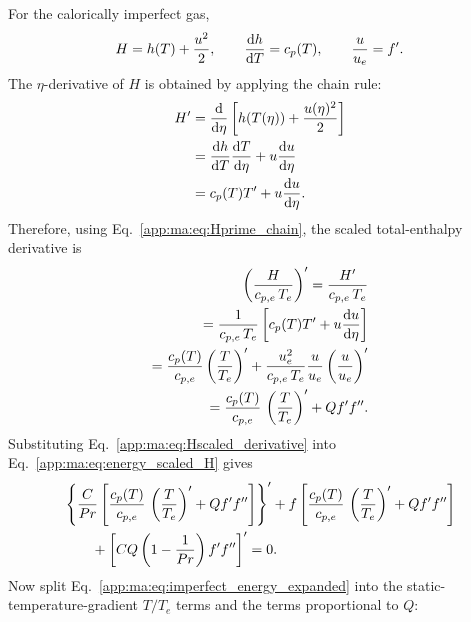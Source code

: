 For the calorically imperfect gas,
\begin{equation}
  H=h(T)+\frac{u^2}{2},
  \qquad
  \frac{\mathrm{d} h}{\mathrm{d} T}=c_p(T),
  \qquad
  \frac{u}{u_e}=f'.
  \label{app:ma:eq:imperfect_enthalpy_def}
\end{equation}
The \(\eta\)-derivative of \(H\) is obtained by applying the chain rule:
\begin{align}
  H'
  &=
  \frac{\mathrm{d}}{\mathrm{d}\eta}
  \left[
    h(T(\eta))+\frac{u(\eta)^2}{2}
  \right]
  \nonumber\\
  &=
  \frac{\mathrm{d} h}{\mathrm{d} T}\frac{\mathrm{d} T}{\mathrm{d}\eta}
  +
  u\frac{\mathrm{d} u}{\mathrm{d}\eta}
  \nonumber\\
  &=
  c_p(T)T'
  +
  u\frac{\mathrm{d} u}{\mathrm{d}\eta}.
  \label{app:ma:eq:Hprime_chain}
\end{align}
Therefore, using Eq.~\eqref{app:ma:eq:Hprime_chain}, the scaled total-enthalpy derivative is
\begin{align}
  \left(\frac{H}{c_{p,e}\,T_e}\right)'
  =
  \frac{H'}{c_{p,e}\,T_e}
  \nonumber\\
  =
  \frac{1}{c_{p,e}\,T_e}
  \left[
    c_p(T)T'
    +
    u\frac{\mathrm{d} u}{\mathrm{d}\eta}
  \right]
  \nonumber\\
  =
  \frac{c_p(T)}{c_{p,e}}
  \left(\frac{T}{T_e}\right)'
  +
  \frac{u_e^2}{c_{p,e}\,T_e}
  \frac{u}{u_e}
  \left(\frac{u}{u_e}\right)'
  \nonumber\\
  =
  \frac{c_p(T)}{c_{p,e}}\,\left(\frac{T}{T_e}\right)'
  +
  Qf'f''.
  \label{app:ma:eq:Hscaled_derivative}
\end{align}
Substituting Eq.~\eqref{app:ma:eq:Hscaled_derivative} into Eq.~\eqref{app:ma:eq:energy_scaled_H} gives
\begin{equation}
  \begin{aligned}
  &
  \left\{
    \frac{C}{Pr}
    \left[
      \frac{c_p(T)}{c_{p,e}}\,\left(\frac{T}{T_e}\right)'
      +
      Qf'f''
    \right]
  \right\}'
  +
  f\left[
    \frac{c_p(T)}{c_{p,e}}\,\left(\frac{T}{T_e}\right)'
    +
    Qf'f''
  \right]\\
  &\qquad+
  \left[
    CQ\left(1-\frac{1}{Pr}\right)f'f''
  \right]'=0.
  \end{aligned}
  \label{app:ma:eq:imperfect_energy_expanded}
\end{equation}
Now split Eq.~\eqref{app:ma:eq:imperfect_energy_expanded} into the static-temperature-gradient \(T/T_e\) terms and the terms proportional to \(Q\):
